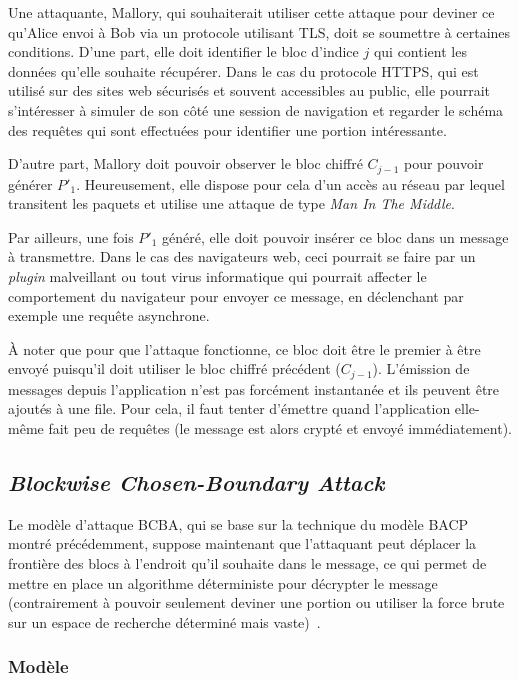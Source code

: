 \documentclass[a4paper,twoside]{article}
\begin{document}
Une attaquante, Mallory, qui souhaiterait utiliser cette attaque pour
deviner ce qu'Alice envoi à Bob via un protocole utilisant TLS, doit se
soumettre à certaines conditions. D'une part, elle doit identifier le bloc
d'indice $j$ qui contient les données qu'elle souhaite récupérer. Dans le
cas du protocole HTTPS, qui est utilisé sur des sites web sécurisés et
souvent accessibles au public, elle pourrait s'intéresser à simuler de son
côté une session de navigation et regarder le schéma des requêtes qui sont
effectuées pour identifier une portion intéressante.

D'autre part, Mallory doit pouvoir observer le bloc chiffré $C_{j-1}$ pour
pouvoir générer $P'_1$. Heureusement, elle dispose pour cela d'un accès au
réseau par lequel transitent les paquets et utilise une attaque de type
\emph{Man In The Middle}.

Par ailleurs, une fois $P'_1$ généré, elle doit pouvoir insérer ce bloc dans
un message à transmettre. Dans le cas des navigateurs web, ceci pourrait se
faire par un \emph{plugin} malveillant ou tout virus informatique qui pourrait
affecter le comportement du navigateur pour envoyer ce message, en
déclenchant par exemple une requête asynchrone.

À noter que pour que l'attaque fonctionne, ce bloc doit être le premier à
être envoyé puisqu'il doit utiliser le bloc chiffré précédent ($C_{j-1}$).
L'émission de messages depuis l'application n'est pas forcément instantanée
et ils peuvent être ajoutés à une file. Pour cela, il faut tenter d'émettre
quand l'application elle-même fait peu de requêtes (le message est alors
crypté et envoyé immédiatement).

\subsection{\emph{Blockwise Chosen-Boundary Attack}}

Le modèle d'attaque BCBA, qui se base sur la technique du modèle BACP montré
précédemment, suppose maintenant que l'attaquant peut déplacer la frontière
des blocs à l'endroit qu'il souhaite dans le message, ce qui permet de
mettre en place un algorithme déterministe pour décrypter le message
(contrairement à pouvoir seulement deviner une portion ou utiliser la force
brute sur un espace de recherche déterminé mais vaste)~\cite{Thai:2011:XOR}.

\subsubsection{Modèle}
\end{document}
